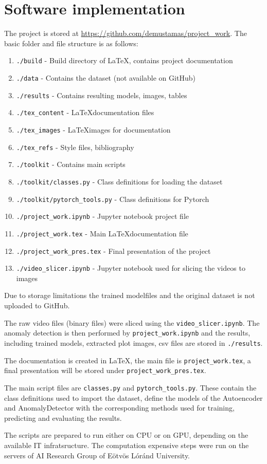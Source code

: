 \section{Software implementation} \label{sw_code}
The project is stored at \url{https://github.com/demustamas/project_work}.
The basic folder and file structure is as follows:

\begin{enumerate}
    \item \lstinline{./build} - Build directory of \LaTeX, contains project documentation
    \item \lstinline{./data} - Contains the dataset (not available on GitHub)
    \item \lstinline{./results} - Contains resulting models, images, tables
    \item \lstinline{./tex_content} - \LaTeX documentation files
    \item \lstinline{./tex_images} - \LaTeX images for documentation
    \item \lstinline{./tex_refs} - Style files, bibliography
    \item \lstinline{./toolkit} - Contains main scripts
    \item \lstinline{./toolkit/classes.py} - Class definitions for loading the dataset
    \item \lstinline{./toolkit/pytorch_tools.py} - Class definitions for Pytorch
    \item \lstinline{./project_work.ipynb} - Jupyter notebook project file
    \item \lstinline{./project_work.tex} - Main \LaTeX documentation file
    \item \lstinline{./project_work_pres.tex} - Final presentation of the project
    \item \lstinline{./video_slicer.ipynb} - Jupyter notebook used for slicing the videos to images
\end{enumerate}

Due to storage limitations the trained modelfiles and the original dataset is not uploaded to GitHub.

The raw video files (binary files) were sliced using the \lstinline{video_slicer.ipynb}.
The anomaly detection is then performed by \lstinline{project_work.ipynb} and the results,
including trained models, extracted plot images, csv files are stored in \lstinline{./results}.

The documentation is created in \LaTeX, the main file is \lstinline{project_work.tex},
a final presentation will be stored under \lstinline{project_work_pres.tex}.

The main script files are \lstinline{classes.py} and \lstinline{pytorch_tools.py}.
These contain the class definitions used to import the dataset, define the models
of the Autoencoder and AnomalyDetector with the corresponding methods used for training,
predicting and evaluating the results.

The scripts are prepared to run either on CPU or on GPU, depending on the available IT infratsructure.
The computation expensive steps were run on the servers of AI Research Group of Eötvös Lóránd University.